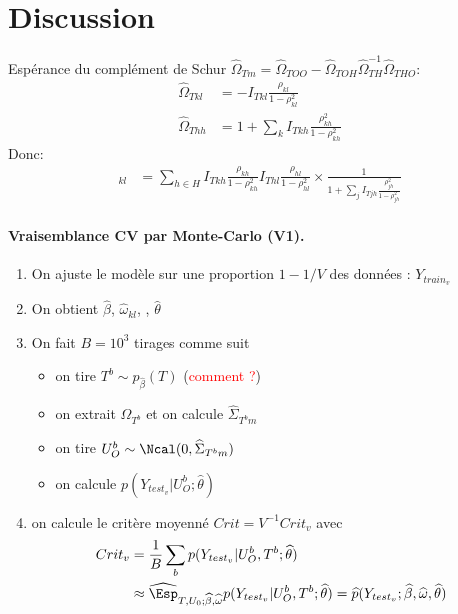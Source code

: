 \section{Discussion}
Espérance du complément de Schur $\widehat{\Omega}_{Tm} = \widehat{\Omega}_{TOO} - \widehat{\Omega}_{TOH}\widehat{\Omega}_{TH}^{-1}\widehat{\Omega}_{THO}$:
\begin{align*}
    \widehat{\Omega}_{Tkl} &= -I_{Tkl} \frac{\rho_{kl}}{1-\rho_{kl}^2}\\
    \widehat{\Omega}_{Thh} &= 1+\sum_k I_{Tkh} \frac{\rho_{kh}^2}{1-\rho_{kh}^2}
\end{align*}
Donc:
\begin{align*}
    [\widehat{\Omega}_{TOH}\widehat{\Omega}_{TH}^{-1}\widehat{\Omega}_{THO}]_{kl} &= \sum_{h\in H} I_{Tkh} \frac{\rho_{kh}}{1-\rho_{kh}^2} I_{Thl} \frac{\rho_{hl}}{1-\rho_{hl}^2} \times \frac{1}{1+\sum_j I_{Tjh} \frac{\rho_{jh}^2}{1-\rho_{jh}^2}}
\end{align*}

\paragraph{Vraisemblance CV par Monte-Carlo (V1).}
\begin{enumerate}
\item On ajuste le modèle sur une proportion $1 - 1/V$ des données : $Y_{train_v}$
\item On obtient $\widehat{\beta}$, $\widehat{\omega}_{kl}$, , $\widehat{\theta}$
\item On fait $B = 10^3$ tirages comme suit
\begin{itemize}
\item on tire $T^b \sim p_{\widehat{\beta}}(T)$ (\textcolor{red}{comment ?})
\item on extrait $\widehat\Omega_{T^b}$ et on calcule $\widehat\Sigma_{T^bm}$ 
\item on tire $U^b_O \sim \Ncal(0, \widehat\Sigma_{T^bm})$
\item on calcule $p(Y_{test_v} | U^b_O; \widehat{\theta})$
\end{itemize}
\item on calcule le critère moyenné $Crit = V^{-1} Crit_v$ avec
\begin{align*}
Crit_v 
& = \frac1B \sum_b p(Y_{test_v} | U^b_O, T^b; \widehat{\theta}) \\
& \approx \widehat{\Esp}_{T, U_0; \widehat{\beta}, \widehat{\omega}} p(Y_{test_v} | U^b_O, T^b; \widehat{\theta}) = \widehat{p}(Y_{test_v}; \widehat{\beta}, \widehat{\omega}, \widehat{\theta})
\end{align*}
\end{enumerate}

